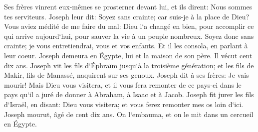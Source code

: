 \verse Ses frères vinrent eux-mêmes se prosterner devant lui, et ils dirent: Nous sommes tes serviteurs. 
\verse Joseph leur dit: Soyez sans crainte; car suis-je à la place de Dieu? 
\verse Vous aviez médité de me faire du mal: Dieu l`a changé en bien, pour accomplir ce qui arrive aujourd`hui, pour sauver la vie à un peuple nombreux. 
\verse Soyez donc sans crainte; je vous entretiendrai, vous et vos enfants. Et il les consola, en parlant à leur coeur. 
\verse Joseph demeura en Égypte, lui et la maison de son père. Il vécut cent dix ans. 
\verse Joseph vit les fils d`Éphraïm jusqu`à la troisième génération; et les fils de Makir, fils de Manassé, naquirent sur ses genoux. 
\verse Joseph dit à ses frères: Je vais mourir! Mais Dieu vous visitera, et il vous fera remonter de ce pays-ci dans le pays qu`il a juré de donner à Abraham, à Isaac et à Jacob. 
\verse Joseph fit jurer les fils d`Israël, en disant: Dieu vous visitera; et vous ferez remonter mes os loin d`ici. 
\verse Joseph mourut, âgé de cent dix ans. On l`embauma, et on le mit dans un cercueil en Égypte. 
